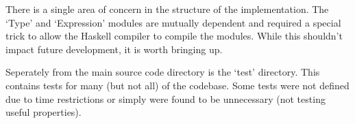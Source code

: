 \documentclass[11pt]{article}
\begin{document}
There is a single area of concern in the structure of the implementation. The `Type' and `Expression' modules are mutually dependent and required a special trick to allow the Haskell compiler to compile the modules. While this shouldn't impact future development, it is worth bringing up.

Seperately from the main source code directory is the  `test' directory. This contains tests for many (but not all) of the codebase. Some tests were not defined due to time restrictions or simply were found to be unnecessary (not testing useful properties).
\end{document}
